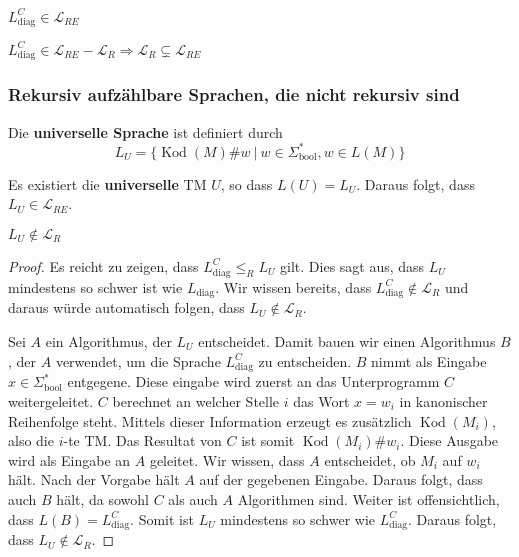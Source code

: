 \begin{lemma}
\( L_\text{diag}^C \in \mathcal{L}_{RE} \)\\
\end{lemma}

\begin{corollary}
\( L_\text{diag}^C \in \mathcal{L}_{RE} - \mathcal{L}_R \Rightarrow \mathcal{L}_R \subsetneq \mathcal{L}_{RE} \)
\end{corollary}

\subsubsection{Rekursiv aufzählbare Sprachen, die nicht rekursiv sind}

\begin{definition}
Die \textbf{universelle Sprache} ist definiert durch \[ L_U = \{ \operatorname{Kod}(M)\#w \ |\ w \in \Sigma_\text{bool}^*, w \in L(M) \} \]
\end{definition}

\begin{satz}
Es existiert die \textbf{universelle} TM \( U \), so dass \( L(U) = L_U \). Daraus folgt, dass \( L_U \in \mathcal{L}_{RE} \).\\
\end{satz}

\begin{satz}
\( L_U \notin \mathcal{L}_R \)
\end{satz}

\begin{proof}
Es reicht zu zeigen, dass \( L_\text{diag}^C \leq_R L_U \) gilt. Dies sagt aus, dass \( L_U \) mindestens so schwer ist wie \( L_\text{diag} \). Wir wissen bereits, dass \( L_\text{diag}^C \notin \mathcal{L}_R \) und daraus würde automatisch folgen, dass \( L_U \notin \mathcal{L}_R \).

Sei \( A \) ein Algorithmus, der \( L_U \) entscheidet. Damit bauen wir einen Algorithmus \( B \), der \( A \) verwendet, um die Sprache \( L_\text{diag}^C \) zu entscheiden. \( B \) nimmt als Eingabe \( x \in \Sigma_\text{bool}^* \) entgegene. Diese eingabe wird zuerst an das Unterprogramm \( C \) weitergeleitet. \( C \) berechnet an welcher Stelle \( i \) das Wort \( x = w_i \) in kanonischer Reihenfolge steht. Mittels dieser Information erzeugt es zusätzlich \( \operatorname{Kod}(M_i) \), also die \( i \)-te TM. Das Resultat von \( C \) ist somit \(\operatorname{Kod}(M_i)\#w_i\). Diese Ausgabe wird als Eingabe an \( A \) geleitet. Wir wissen, dass \( A \) entscheidet, ob \( M_i \) auf \( w_i \) hält. Nach der Vorgabe hält \( A \) auf der gegebenen Eingabe. Daraus folgt, dass auch \( B \) hält, da sowohl \( C \) als auch \( A \) Algorithmen sind. Weiter ist offensichtlich, dass \( L(B) = L_\text{diag}^C \). Somit ist \( L_U \) mindestens so schwer wie \( L_\text{diag}^C \). Daraus folgt, dass \( L_U \notin \mathcal{L}_R \).
\end{proof}

